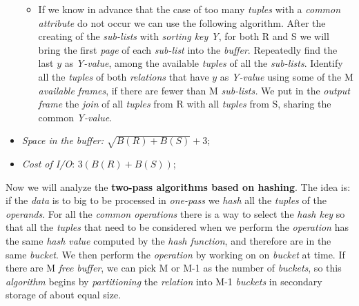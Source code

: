 \documentclass{article}
\begin{document}
\begin{itemize}
\begin{itemize}
\item If we know in advance that the case of too many \emph{tuples} with a \emph{common attribute} do not occur we can use the following algorithm. After the creating of the \emph{sub-lists} with \emph{sorting key Y}, for both R and S we will bring the first \emph{page} of each \emph{sub-list} into the \emph{buffer}. Repeatedly find the last $y$ as\emph{ Y-value}, among the available \emph{tuples} of all the \emph{sub-lists}. Identify all the \emph{tuples} of both \emph{relations} that have $y$ as\emph{ Y-value} using some of the M \emph{available frames}, if there are fewer than M \emph{sub-lists.} We put in the \emph{output frame }the \emph{join} of all \emph{tuples} from R with all \emph{tuples} from S, sharing the common\emph{ Y-value}.
\end{itemize}
\item \emph{Space in the buffer:} $\sqrt{B(R)+B(S)}+3$;
\item \emph{Cost of I/O}: $3(B(R)+B(S))$;
\end{itemize}
Now we will analyze the \textbf{two-pass algorithms based on hashing}. The idea is: if the \emph{data} is to big to be processed in \emph{one-pass} we \emph{hash} all the \emph{tuples} of the \emph{operands}. For all the \emph{common operations} there is a way to select the \emph{hash key} so that all the \emph{tuples} that need to be considered when we perform the \emph{operation} has the same \emph{hash value} computed by the \emph{hash function}, and therefore are in the same \emph{bucket}. We then perform the \emph{operation} by working on on \emph{bucket} at time. If there are M \emph{free buffer}, we can pick M or M-1 as the number of \emph{buckets}, so this \emph{algorithm} begins by \emph{partitioning} the \emph{relation} into M-1 \emph{buckets} in secondary storage of about equal size. 
\end{document}
